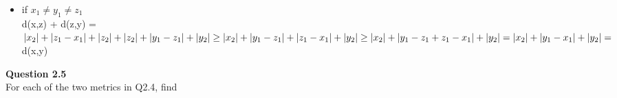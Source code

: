 \documentclass[12pt]{article}
\begin{document}
\begin{itemize}
\begin{enumerate}[label=(\roman*)]
\begin{itemize}
                   \item if $x_1 \neq y_1 \neq z_1$\\
                   d(x,z) + d(z,y) = $|x_2| + |z_1 - x_1| + |z_2| + |z_2| + |y_1 - z_1| + |y_2| \\
                   \ge |x_2| + |y_1 - z_1| + |z_1 - x_1| + |y_2|\\
                   \ge |x_2| + |y_1 - z_1 + z_1 - x_1| + |y_2| = |x_2| + |y_1 - x_1| + |y_2|\\ = $d(x,y)
               \end{itemize}
              

            \end{enumerate}
    \end{itemize}


\newpage
\noindent
\textbf{Question 2.5}\\
For each of the two metrics in Q2.4, find
\end{document}
